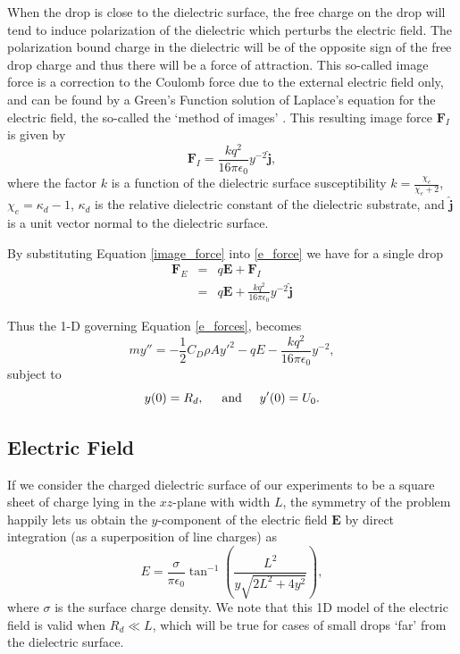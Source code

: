 \documentclass[aip,reprint, floatfix]{revtex4-1}
\begin{document}
When the drop is close to the dielectric surface, the free charge on the drop will tend to induce polarization of the dielectric which perturbs the electric field. The polarization bound charge in the dielectric will be of the opposite sign of the free drop charge and thus there will be a force of attraction. This so-called image force is a correction to the Coulomb force due to the external electric field only, and can be found by a Green's Function solution of Laplace's equation for the electric field, the so-called the `method of images' \cite{david_j._griffiths_introduction_1999}. This resulting image force $\mathbf{F}_I$ is given by
\begin{equation}
\mathbf{F}_I = \frac{k q^2}{16 \pi \epsilon_0} y^{-2} \hat{\mathbf{j}},
\label{image_force}
\end{equation}
where the factor $k$ is a function of the dielectric surface susceptibility $k = \frac{\chi_e}{\chi_e + 2}$, $\chi_e = \kappa_d - 1$, $\kappa_d$ is the relative dielectric constant of the dielectric substrate, and $\hat{\mathbf{j}}$ is a unit vector normal to the dielectric surface.

By substituting Equation \ref{image_force} into \ref{e_force} we have for a single drop
\begin{eqnarray}
 \mathbf{F}_E &=& q \mathbf{E} + \mathbf{F}_I \nonumber \\
 &=& q \mathbf{E} + \frac{k q^2}{16 \pi \epsilon_0 } y^{-2} \hat{\mathbf{j}} \label{e_forces}
\end{eqnarray}

Thus the 1-D governing Equation \ref{e_forces}, becomes
\begin{equation}
 \label{gov_eqn_subs}
m y'' = - \frac{1}{2} C_D \rho A {y'}^2 - q E - \frac{k q^2}{16 \pi \epsilon_0} y^{-2},
\end{equation}
subject to
\begin{equation}
y(0) = R_d, \hspace{5 mm} \mbox{and} \hspace{5 mm} y'(0) = U_0 .
\end{equation}

\subsection{Electric Field}
If we consider the charged dielectric surface of our experiments to be a square sheet of charge lying in the $xz$-plane with width $L$, the symmetry of the problem happily lets us obtain the $y$-component of the electric field $\mathbf{E}$ by direct integration (as a superposition of line charges) \citep{david_j._griffiths_introduction_1999} as
\begin{equation}
\label{e_field}
E = \frac{\sigma}{ \pi \epsilon_0} \tan^{-1} \left( \frac{L^2}{y \sqrt{2L^2 + 4y^2}}\right)
,\end{equation}
where $\sigma$ is the surface charge density. We note that this 1D model of the electric field is valid when $R_d \ll L$, which will be true for cases of small drops `far' from the dielectric surface. 
\end{document}
